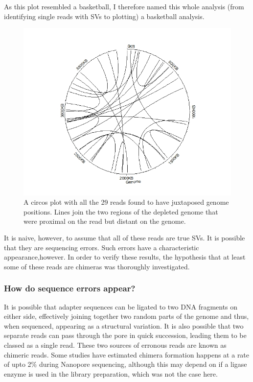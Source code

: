 \documentclass{article}
\begin{document}
As this plot resembled a basketball, I therefore named this whole analysis (from identifying single reads with SVs to plotting) a basketball analysis.


\begin{figure}[h!]
\centering
\includegraphics[width=\textwidth{}]{Chapter_2/Circos_Naive.jpeg}
\caption{A circos plot with all the 29 reads found to have juxtaposed genome positions. Lines join the two regions of the depleted genome that were proximal on the read but distant on the genome.}
\label{fig:Junc_proximity}
\end{figure}

It is naive, however, to assume that all of these reads are true SVs. It is possible that they are sequencing errors. Such errors have a characteristic appearance,however. In order to verify these results, the  hypothesis that at least some of these reads are chimeras was thoroughly investigated.

\subsubsection{How do sequence errors appear?}
It is possible that adapter sequences can be ligated to two DNA fragments on either side, effectively joining together two random parts of the genome and thus, when sequenced, appearing as a structural variation. It is also possible that two separate reads can pass through the pore in quick succession, leading them to be classed as a single read. These two sources of erronous reads are known as chimeric reads. Some studies have estimated chimera formation happens at a rate of upto 2\% during Nanopore sequencing, although this may depend on if a ligase enzyme is used in the library preparation, which was not the case here.
 
\end{document}
